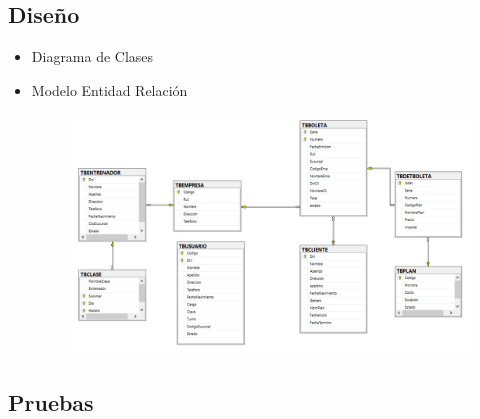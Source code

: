 \subsection{Diseño}
\begin{itemize}
	\item Diagrama de Clases

	\item Modelo Entidad Relación
\begin{figure}[H]
		\begin{center}
			\includegraphics[width=15cm]{./Imagenes/MEntidadRelacion}
		\end{center}
	\end{figure}
\end{itemize}



\subsection{Pruebas}






